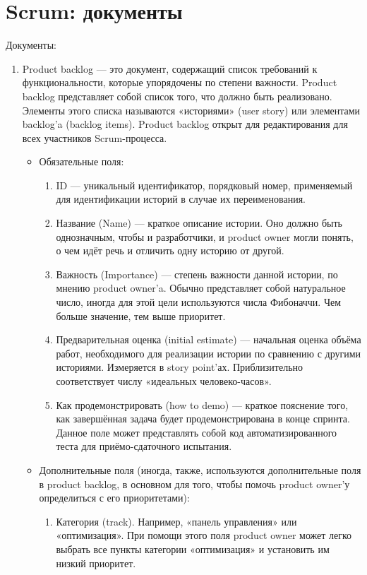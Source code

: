 \documentclass{article}
\begin{document}
\section{Scrum: документы}
    Документы:
    \begin{enumerate}
        \item Product backlog — это документ, содержащий список требований к функциональности, которые упорядочены по степени важности. Product backlog представляет собой список того, что должно быть реализовано. Элементы этого списка называются «историями» (user story) или элементами backlog’a (backlog items). Product backlog открыт для редактирования для всех участников Scrum-процесса.
        \begin{itemize}
            \item Обязательные поля:
            \begin{enumerate}
                \item ID — уникальный идентификатор, порядковый номер, применяемый для идентификации историй в случае их переименования.
                \item Название (Name) — краткое описание истории. Оно должно быть однозначным, чтобы и разработчики, и product owner могли понять, о чем идёт речь и отличить одну историю от другой.
                \item Важность (Importance) — степень важности данной истории, по мнению product owner’a. Обычно представляет собой натуральное число, иногда для этой цели используются числа Фибоначчи. Чем больше значение, тем выше приоритет.
                \item Предварительная оценка (initial estimate) — начальная оценка объёма работ, необходимого для реализации истории по сравнению с другими историями. Измеряется в story point’ах. Приблизительно соответствует числу «идеальных человеко-часов».
                \item Как продемонстрировать (how to demo) — краткое пояснение того, как завершённая задача будет продемонстрирована в конце спринта. Данное поле может представлять собой код автоматизированного теста для приёмо-сдаточного испытания.
            \end{enumerate}
            \item Дополнительные поля (иногда, также, используются дополнительные поля в product backlog, в основном для того, чтобы помочь product owner’у определиться с его приоритетами):
            \begin{enumerate}
                \item Категория (track). Например, «панель управления» или «оптимизация». При помощи этого поля product owner может легко выбрать все пункты категории «оптимизация» и установить им низкий приоритет.

\end{enumerate}
\end{itemize}
\end{enumerate}
\end{document}
